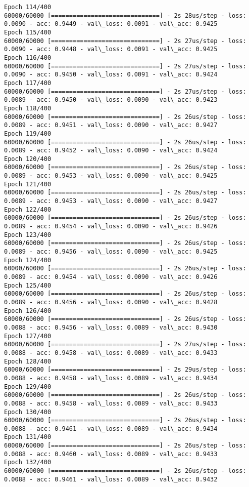 \documentclass[11pt]{article}
\begin{document}
\begin{Verbatim}[commandchars=\\\{\}]
Epoch 114/400
60000/60000 [==============================] - 2s 28us/step - loss: 0.0090 - acc: 0.9449 - val\_loss: 0.0091 - val\_acc: 0.9425
Epoch 115/400
60000/60000 [==============================] - 2s 27us/step - loss: 0.0090 - acc: 0.9448 - val\_loss: 0.0091 - val\_acc: 0.9425
Epoch 116/400
60000/60000 [==============================] - 2s 27us/step - loss: 0.0090 - acc: 0.9450 - val\_loss: 0.0091 - val\_acc: 0.9424
Epoch 117/400
60000/60000 [==============================] - 2s 27us/step - loss: 0.0089 - acc: 0.9450 - val\_loss: 0.0090 - val\_acc: 0.9423
Epoch 118/400
60000/60000 [==============================] - 2s 26us/step - loss: 0.0089 - acc: 0.9451 - val\_loss: 0.0090 - val\_acc: 0.9427
Epoch 119/400
60000/60000 [==============================] - 2s 26us/step - loss: 0.0089 - acc: 0.9452 - val\_loss: 0.0090 - val\_acc: 0.9424
Epoch 120/400
60000/60000 [==============================] - 2s 26us/step - loss: 0.0089 - acc: 0.9453 - val\_loss: 0.0090 - val\_acc: 0.9425
Epoch 121/400
60000/60000 [==============================] - 2s 26us/step - loss: 0.0089 - acc: 0.9453 - val\_loss: 0.0090 - val\_acc: 0.9427
Epoch 122/400
60000/60000 [==============================] - 2s 26us/step - loss: 0.0089 - acc: 0.9454 - val\_loss: 0.0090 - val\_acc: 0.9426
Epoch 123/400
60000/60000 [==============================] - 2s 26us/step - loss: 0.0089 - acc: 0.9456 - val\_loss: 0.0090 - val\_acc: 0.9425
Epoch 124/400
60000/60000 [==============================] - 2s 26us/step - loss: 0.0089 - acc: 0.9454 - val\_loss: 0.0090 - val\_acc: 0.9426
Epoch 125/400
60000/60000 [==============================] - 2s 26us/step - loss: 0.0089 - acc: 0.9456 - val\_loss: 0.0090 - val\_acc: 0.9428
Epoch 126/400
60000/60000 [==============================] - 2s 26us/step - loss: 0.0088 - acc: 0.9456 - val\_loss: 0.0089 - val\_acc: 0.9430
Epoch 127/400
60000/60000 [==============================] - 2s 27us/step - loss: 0.0088 - acc: 0.9458 - val\_loss: 0.0089 - val\_acc: 0.9433
Epoch 128/400
60000/60000 [==============================] - 2s 29us/step - loss: 0.0088 - acc: 0.9458 - val\_loss: 0.0089 - val\_acc: 0.9434
Epoch 129/400
60000/60000 [==============================] - 2s 26us/step - loss: 0.0088 - acc: 0.9458 - val\_loss: 0.0089 - val\_acc: 0.9433
Epoch 130/400
60000/60000 [==============================] - 2s 26us/step - loss: 0.0088 - acc: 0.9461 - val\_loss: 0.0089 - val\_acc: 0.9434
Epoch 131/400
60000/60000 [==============================] - 2s 26us/step - loss: 0.0088 - acc: 0.9460 - val\_loss: 0.0089 - val\_acc: 0.9433
Epoch 132/400
60000/60000 [==============================] - 2s 26us/step - loss: 0.0088 - acc: 0.9461 - val\_loss: 0.0089 - val\_acc: 0.9432

\end{Verbatim}
\end{document}
